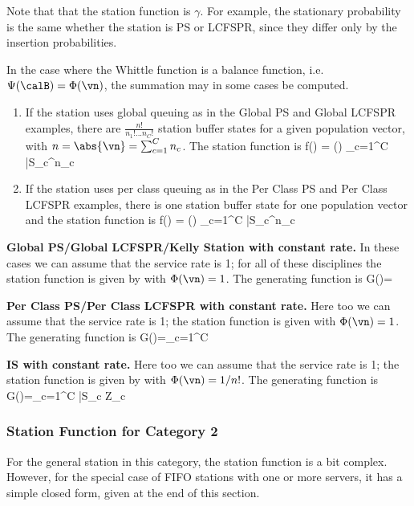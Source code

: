  Note that that the station function is  $\gamma$. For example, the
 stationary probability is the same whether the
 station is PS or LCFSPR, since they differ only by
 the insertion probabilities.

 In the case where the Whittle function is a
 balance function, i.e. $\Psi(\calB)=\Phi(\vn)$,
 the summation may in some cases be computed.
 \begin{enumerate}
    \item If the station
 uses global queuing as in the Global PS and
 Global LCFSPR examples,
 there are $\frac{n!}{n_1! ... n_C!}$ station buffer states for
 a given population vector, with $n=\abs{\vn}=\sum_{c=1}^C n_c$.
 The station function is
   \be
  f(\vn) = 
   \Phi(\vn)
  \prod_{c=1}^C  \bar{S}_c^{n_c}
  \label{eq-q-stf-t2ss}
  \ee
    \item If the station uses per class queuing as in the
        Per Class PS and Per Class LCFSPR examples, there
        is one station buffer state for one population
        vector and the station function is
  \be f(\vn) =
   \Phi(\vn)
  \prod_{c=1}^C  \bar{S}_c^{n_c}
  \label{eq-q-stf-t2sspc}
  \ee
 \end{enumerate}


\textbf{Global PS/Global LCFSPR/Kelly Station
with constant rate.} In these cases we can assume
that the service rate is 1; for all of these
disciplines the station function is given by
 with $\Phi(\vn)=1$. The
generating function is
 \be
G(\vZ)=\label{eq-q-stat-t2-z}
 \ee

 \textbf{Per Class PS/Per Class LCFSPR with
constant rate.} Here too we can assume that the
service rate is 1; the station function is given
 with $\Phi(\vn)=1$. The
generating function is
 \be
G(\vZ)=\prod_{c=1}^C\label{eq-q-stat-t2pc-z}
 \ee

\textbf{IS with constant rate. } Here too we can
assume that the service rate is 1; the station
function is given by  with
$\Phi(\vn)=1/n!$. The generating function is
 \be
G(\vZ)=\lp \sum_{c=1}^C \bar{S_c
}Z_c\rp \label{eq-q-stat-t3-z}
 \ee


\subsubsection{Station Function for
Category 2} For the general station in this category, the
station function is a bit complex. However, for the special
case of FIFO stations with one or more servers, it has a simple
closed form, given at the end of this section.

